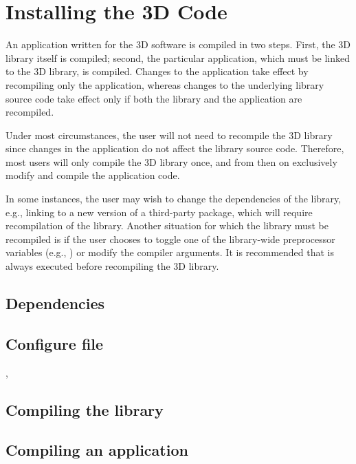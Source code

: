 %
%

\chapter{Installing the \hp3D Code}
\label{chap:installing}


An application written for the \hp3D software is compiled in two steps. First, the \hp3D library itself is compiled; second, the particular application, which must be linked to the \hp3D library, is compiled. Changes to the application take effect by recompiling only the application, whereas changes to the underlying library source code take effect only if both the library and the application are recompiled.

Under most circumstances, the user will not need to recompile the \hp3D library since changes in the application do not affect the library source code. Therefore, most users will only compile the \hp3D library once, and from then on exclusively modify and compile the application code.

In some instances, the user may wish to change the dependencies of the library, e.g., linking to a new version of a third-party package, which will require recompilation of the library. Another situation for which the library must be recompiled is if the user chooses to toggle one of the library-wide preprocessor variables (e.g., ) or modify the compiler arguments. It is recommended that  is always executed before recompiling the \hp3D library.

\section{Dependencies}
\label{sec:dependencies}

\section{Configure file}
\label{sec:configure-file}

,

\section{Compiling the library}
\label{sec:compiling}

\section{Compiling an application}
\label{sec:application}

%


